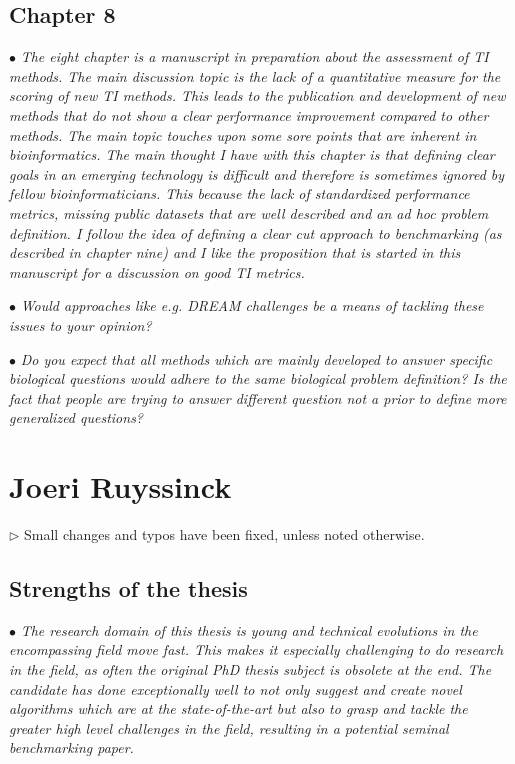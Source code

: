 \documentclass[10pt]{article}
\newcommand{\exam}[2][\  ]{\hspace{0pt}\marginpar{\color{red}#1}$\bullet$ \textit{#2}}
\newcommand{\nimp}[1]{{\color{gray} #1}}
\newcommand{\answ}[1]{{\color{blue} $\triangleright$ #1}}
\begin{document}
{\subsection{Chapter 8}
\exam{\nimp{The eight chapter is a manuscript in preparation about the assessment of TI methods. The
		main discussion topic is the lack of a quantitative measure for the scoring of new TI
		methods. This leads to the publication and development of new methods that do not show
		a clear performance improvement compared to other methods. The main topic touches
		upon some sore points that are inherent in bioinformatics. The main thought I have with
		this chapter is that defining clear goals in an emerging technology is difficult and therefore is
		sometimes ignored by fellow bioinformaticians. This because the lack of standardized
		performance metrics, missing public datasets that are well described and an ad hoc problem
		definition. I follow the idea of defining a clear cut approach to benchmarking (as described
		in chapter nine) and I like the proposition that is started in this manuscript for a discussion
		on good TI metrics.}}

\exam{Would approaches like e.g. DREAM challenges be a means of tackling these issues
	to your opinion?}

\exam{Do you expect that all methods which are mainly developed to answer specific
	biological questions would adhere to the same biological problem definition? Is the fact that
	people are trying to answer different question not a prior to define more generalized
	questions?}

\section{Joeri Ruyssinck}

\answ{Small changes and typos have been fixed, unless noted otherwise.}

\subsection{Strengths of the thesis}

\exam{\nimp{The research domain of this thesis is young and technical evolutions in the
	encompassing field move fast. This makes it especially challenging to do
	research in the field, as often the original PhD thesis subject is obsolete at the
	end. The candidate has done exceptionally well to not only suggest and create
	novel algorithms which are at the state-of-the-art but also to grasp and tackle
	the greater high level challenges in the field, resulting in a potential seminal
	benchmarking paper.}}

}
\end{document}
